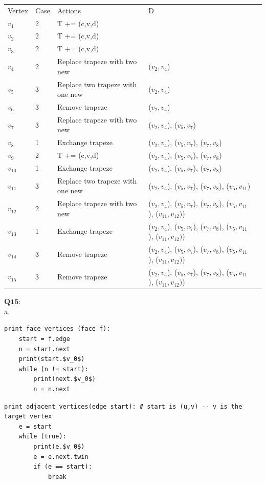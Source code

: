 \documentclass[]{article}
\begin{document}
	\begin{table}[H]
	\begin{tabular}{lllll}
		Vertex & Case & Actions & D &  \\
		$v_1$ & 2 & T += (c,v,d) & {} &  \\
		$v_2$ & 2 & T += (c,v,d) & {} &  \\
		$v_3$ & 2 & T += (c,v,d) & {} &  \\
		$v_4$ & 2 & Replace trapeze with two new & {($v_2, v_4$)} &  \\
		$v_5$ & 3 & Replace two trapeze with one new & {($v_2, v_4$)} &  \\
		$v_6$ & 3 & Remove trapeze & {($v_2, v_4$)} &  \\
		$v_7$ & 3 & Replace trapeze with two new & {($v_2, v_4$), ($v_5, v_7$)} &  \\
		$v_8$ & 1 & Exchange trapeze & {($v_2, v_4$), ($v_5, v_7$), ($v_7, v_8$)} &  \\
		$v_9$ & 2 & T += (c,v,d) & {($v_2, v_4$), ($v_5, v_7$), ($v_7, v_8$)} &  \\
		$v_{10}$ & 1 & Exchange trapeze & {($v_2, v_4$), ($v_5, v_7$), ($v_7, v_8$)} &  \\
		$v_{11}$ & 3 & Replace two trapeze with one new & {($v_2, v_4$), ($v_5, v_7$), ($v_7, v_8$), ($v_5, v_{11}$)} &  \\
		$v_{12}$ & 2 & Replace trapeze with two new & ($v_2, v_4$), ($v_5, v_7$), ($v_7, v_8$), ($v_5, v_{11}$), ($v_{11}, v_{12})$) &  \\
		$v_{13}$ & 1 & Exchange trapeze & ($v_2, v_4$), ($v_5, v_7$), ($v_7, v_8$), ($v_5, v_{11}$), ($v_{11}, v_{12})$) &  \\
		$v_{14}$ & 3 & Remove trapeze & ($v_2, v_4$), ($v_5, v_7$), ($v_7, v_8$), ($v_5, v_{11}$), ($v_{11}, v_{12})$) &  \\
		$v_{15}$ & 3 & Remove trapeze & ($v_2, v_4$), ($v_5, v_7$), ($v_7, v_8$), ($v_5, v_{11}$), ($v_{11}, v_{12})$) & 
	\end{tabular}
	\end{table}
	
	$\textbf{Q15:}$\\
	a.
	\begin{lstlisting}
print_face_vertices (face f):
	start = f.edge
	n = start.next
	print(start.$v_0$)
	while (n != start):
		print(next.$v_0$)
		n = n.next
	\end{lstlisting}
	\begin{lstlisting}
print_adjacent_vertices(edge start): # start is (u,v) -- v is the target vertex
	e = start
	while (true):
		print(e.$v_0$)
		e = e.next.twin
		if (e == start):
			break
		
	\end{lstlisting}
\end{document}
